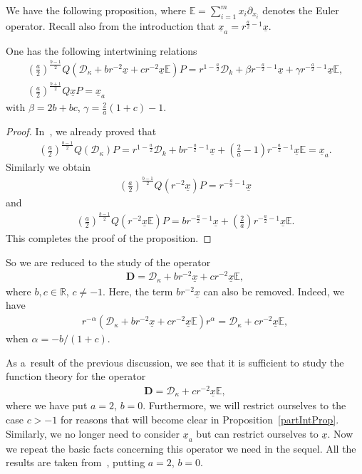 \documentclass[pdftex]{sigma}
\numberwithin{equation}{section}
\numberwithin{theorem}{section}
\numberwithin{proposition}{section}
\numberwithin{lemma}{section}
\numberwithin{corollary}{section}
\numberwithin{definition}{section}
\numberwithin{example}{section}
\numberwithin{remark}{section}
\numberwithin{note}{section}
\theoremstyle{remark}
\newcommand{\mR}{\mathbb{R}}
\newcommand{\mE}{\mathbb{E}}
\newcommand{\cD}{\mathcal{D}}
\newcommand{\dD}{\textbf{D}}
\newcommand{\ux}{\underline{x}}
\def\b{{\beta}}
\def\g{{\gamma}}
\def\k{{\kappa}}
\begin{document}
We have the following proposition, where $\mE=\sum\limits_{i=1}^{m}x_{i}\partial_{x_{i}}$ denotes the
Euler operator.
Recall also from the introduction that $\ux_{a}=r^{\frac{a}{2}-1}\ux$.

\begin{proposition}
One has the following intertwining relations
\begin{gather*}
\left(\frac{a}{2} \right)^{\frac{b-1}{2}} Q \left( \cD_{\k} + b r^{-2} \ux + c r^{-2}\ux \mE
\right) P = r^{1- \frac{a}{2}}\cD_{k} + \b r^{-\frac{a}{2}-1} \ux + \g r^{-\frac{a}{2}-1}\ux \mE,\\
\left(\frac{a}{2} \right)^{\frac{b+1}{2}} Q \ux P = \ux_{a}
\end{gather*}
with
$
\b= 2b+ bc$, $
\g= \frac{2}{a} (1+c) -1$.
\end{proposition}

\begin{proof}
In~\cite[Proposition 3]{H12}, we already proved that
\begin{gather*}
\left(\frac{a}{2}\right)^{\frac{b-1}{2}}Q\left(\cD_{\k}\right)P=r^{1-\frac{a}{2}}\cD_{k}+
b r^{-\frac{a}{2}-1}\ux+\left(\frac{2}{a}-1\right)r^{-\frac{a}{2}-1}\ux\mE=\ux_{a}.
\end{gather*}
Similarly we obtain
\begin{gather*}
\left(\frac{a}{2}\right)^{\frac{b-1}{2}}Q\left(r^{-2}\ux\right)P=r^{-\frac{a}{2}-1}\ux
\end{gather*}
and
\begin{gather*}
\left(\frac{a}{2}\right)^{\frac{b-1}{2}}Q\left(r^{-2}\ux\mE\right)P=b r^{-\frac{a}{2}-1}
\ux+\left(\frac{2}{a}\right)r^{-\frac{a}{2}-1}\ux\mE.
\end{gather*}
This completes the proof of the proposition.
\end{proof}

So we are reduced to the study of the operator
\begin{gather*}
\dD=\cD_{\k}+b r^{-2}\ux+c r^{-2}\ux\mE,
\end{gather*}
where $b,c\in\mR$, $c\neq-1$.
Here, the term $b r^{-2}\ux$ can also be removed.
Indeed, we have
\begin{gather*}
r^{-\alpha}\left(\cD_{\k}+b r^{-2}\ux+c r^{-2}\ux\mE\right)r^{\alpha}=\cD_{\k}+c
r^{-2}\ux\mE,
\end{gather*}
when $\alpha=-b/(1+c)$.

As a~result of the previous discussion, we see that it is suf\/f\/icient to study the function theory
for the operator
\begin{gather*}
\dD=\cD_{\k}+c r^{-2}\ux\mE,
\end{gather*}
where we have put $a=2$, $b=0$.
Furthermore, we will restrict ourselves to the case $c>-1$ for reasons that will become clear in
Proposition~\ref{partIntProp}.
Similarly, we no longer need to consider $\ux_{a}$ but can restrict ourselves to $\ux$.
Now we repeat the basic facts concerning this operator we need in the sequel.
All the results are taken from~\cite{H12}, putting $a=2$, $b=0$.
\end{document}
